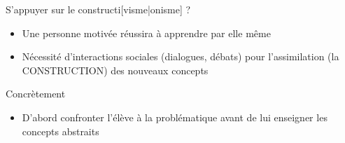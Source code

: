 \begin{frame}{S'appuyer sur le constructi[visme|onisme] ?}
\begin{itemize}
  \item Une personne motivée réussira à apprendre par elle même
  \item Nécessité d'interactions sociales (dialogues, débats) pour l'assimilation (la CONSTRUCTION) des nouveaux concepts
\end{itemize}
\end{frame}

\begin{frame}{Concrètement}
\begin{itemize}
  \item D'abord confronter l'élève à la problématique avant de lui enseigner les concepts abstraits
\end{itemize}
\end{frame}